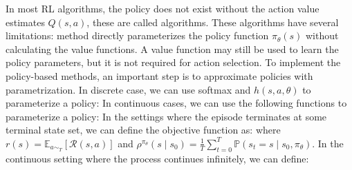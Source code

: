 \documentclass[10pt]{report}
\begin{document}
In most RL algorithms, the policy does not exist without the action value estimates $Q(s,a)$, these are called  algorithms.
These algorithms have several limitations:
 method directly parameterizes the policy function $\pi_\theta(s)$ without calculating the value functions.
A value function may still be used to learn the policy parameters, but it is not required for action selection. To implement the policy-based methods,
an important step is to approximate policies with parametrization. In discrete case, we can use softmax and 
$h(s,a,\theta)$ to parameterize a policy:
In continuous cases, we can use the following functions to parameterize a policy:
In the settings where the episode terminates at some terminal state set, we can define the objective function as:
where $r(s)=\mathbb{E}_{a\operatorname*{\sim}_{T}}[\mathcal{R}(s,a)]$ and $\rho^{\pi_\theta}(s\mid s_0)=\frac{1}{T}\sum_{t=0}^T\mathbb{P}(s_t=s\mid s_0,\pi_\theta)$.
In the continuous setting where the process continues infinitely, we can define:
\end{document}
